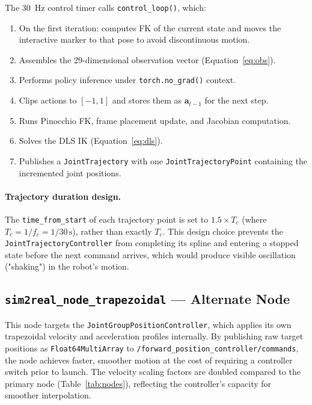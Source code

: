 \documentclass[12pt, a4paper]{article}
\begin{document}
The 30~Hz control timer calls \texttt{control\_loop()}, which:
\begin{enumerate}
  \item On the first iteration: computes FK of the current state and moves the interactive
        marker to that pose to avoid discontinuous motion.
  \item Assembles the 29-dimensional observation vector (Equation~\ref{eq:obs}).
  \item Performs policy inference under \texttt{torch.no\_grad()} context.
  \item Clips actions to $[-1, 1]$ and stores them as $\mathbf{a}_{t-1}$ for the next step.
  \item Runs Pinocchio FK, frame placement update, and Jacobian computation.
  \item Solves the DLS IK (Equation~\ref{eq:dls}).
  \item Publishes a \texttt{JointTrajectory} with one \texttt{JointTrajectoryPoint} containing
        the incremented joint positions.
\end{enumerate}

\paragraph{Trajectory duration design.}
The \texttt{time\_from\_start} of each trajectory point is set to $1.5 \times T_c$
(where $T_c = 1/f_c = 1/30\,\text{s}$), rather than exactly $T_c$. This design
choice prevents the \texttt{JointTrajectoryController} from completing its spline
and entering a stopped state before the next command arrives, which would produce
visible oscillation ("shaking") in the robot's motion.

\subsection{\texttt{sim2real\_node\_trapezoidal} — Alternate Node}
\label{ssec:sim2real_node_trapezoidal}

This node targets the \texttt{JointGroupPositionController}, which applies its own
trapezoidal velocity and acceleration profiles internally. By publishing raw target
positions as \texttt{Float64MultiArray} to \texttt{/forward\_position\_controller/commands},
the node achieves faster, smoother motion at the cost of requiring a controller switch
prior to launch. The velocity scaling factors are doubled compared to the primary node
(Table~\ref{tab:nodes}), reflecting the controller's capacity for smoother interpolation.
\end{document}

